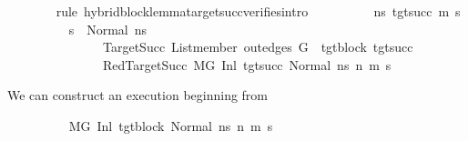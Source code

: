\begin{isabellebody}
\ \ \ \ \ \ \isamarkupfalse%
\ {\isacharparenleft}{\kern0pt}rule\ hybrid{\isacharunderscore}{\kern0pt}block{\isacharunderscore}{\kern0pt}lemma{\isacharunderscore}{\kern0pt}target{\isacharunderscore}{\kern0pt}succ{\isacharunderscore}{\kern0pt}verifies{\isacharunderscore}{\kern0pt}intro{\isacharparenright}{\kern0pt}\isanewline
\ \ \ \ \ \ \ \ \isamarkupfalse%
\ ns{}{\isacharprime}{\kern0pt}\ tgt{\isacharunderscore}{\kern0pt}succ\ m{}{\isacharprime}{\kern0pt}\ s{}{\isacharprime}{\kern0pt}\isanewline
\ \ \ \ \ \ \ \ \isamarkupfalse%
\ {\isachardoublequoteopen}s{}{\isacharprime}{\kern0pt}\ {\isacharequal}{\kern0pt}\ Normal\ ns{}{\isacharprime}{\kern0pt}{\isachardoublequoteclose}\ \ \isanewline
\ \ \ \ \ \ \ \ \ \ \ \ \ \ \ TargetSucc{\isacharcolon}{\kern0pt}\ {\isachardoublequoteopen}List{\isachardot}{\kern0pt}member\ {\isacharparenleft}{\kern0pt}out{\isacharunderscore}{\kern0pt}edges\ G{\isacharprime}{\kern0pt}\ {\isacharbang}{\kern0pt}\ tgt{\isacharunderscore}{\kern0pt}block{\isacharparenright}{\kern0pt}\ tgt{\isacharunderscore}{\kern0pt}succ{\isachardoublequoteclose}\ \isanewline
\ \ \ \ \ \ \ \ \ \ \ \ \ \ \ RedTargetSucc{\isacharcolon}{\kern0pt}\ {\isachardoublequoteopen}M{\isacharcomma}{\kern0pt}{\isasymLambda}{\isacharcomma}{\kern0pt}{\isasymGamma}{\isacharcomma}{\kern0pt}{\isasymOmega}{\isacharcomma}{\kern0pt}G{\isacharprime}{\kern0pt}\ {\isasymturnstile}{\isacharparenleft}{\kern0pt}Inl\ tgt{\isacharunderscore}{\kern0pt}succ{\isacharcomma}{\kern0pt}\ Normal\ ns{}{\isacharprime}{\kern0pt}{\isacharparenright}{\kern0pt}\ {\isacharminus}{\kern0pt}n{\isasymrightarrow}{\isacharasterisk}{\kern0pt}\ {\isacharparenleft}{\kern0pt}m{}{\isacharprime}{\kern0pt}{\isacharcomma}{\kern0pt}\ s{}{\isacharprime}{\kern0pt}{\isacharparenright}{\kern0pt}{\isachardoublequoteclose}%
\begin{isamarkuptext}%
We can construct an execution beginning from %
\end{isamarkuptext}\isamarkuptrue%
\ \ \ \ \ \ \ \ \isamarkupfalse%
\ {\isachardoublequoteopen}M{\isacharcomma}{\kern0pt}{\isasymLambda}{\isacharcomma}{\kern0pt}{\isasymGamma}{\isacharcomma}{\kern0pt}{\isasymOmega}{\isacharcomma}{\kern0pt}G{\isacharprime}{\kern0pt}\ {\isasymturnstile}{\isacharparenleft}{\kern0pt}Inl\ tgt{\isacharunderscore}{\kern0pt}block{\isacharcomma}{\kern0pt}\ Normal\ ns{\isacharparenright}{\kern0pt}\ {\isacharminus}{\kern0pt}n{\isasymrightarrow}{\isacharasterisk}{\kern0pt}\ {\isacharparenleft}{\kern0pt}m{}{\isacharprime}{\kern0pt}{\isacharcomma}{\kern0pt}\ s{}{\isacharprime}{\kern0pt}{\isacharparenright}{\kern0pt}{\isachardoublequoteclose}\isanewline

\end{isabellebody}
